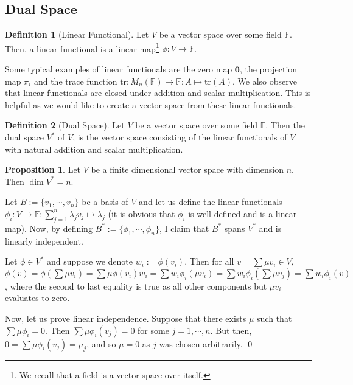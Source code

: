\documentclass[
]{article}
\theoremstyle{definition}
\newtheorem{prop}{Proposition}[section]
\theoremstyle{definition}
\newtheorem{definition}{Definition}[section]
\begin{document}
\hypertarget{dual-space}{%
\subsection{Dual Space}\label{dual-space}}

\begin{definition}[Linear Functional]
  Let \(V\) be a vector space over some field \(\mathbb{F}\). Then, a linear 
  functional is a linear map\footnote{We recall that a field is a vector 
  space over itself.} \(\phi : V \to \mathbb{F}\).
\end{definition}

Some typical examples of linear functionals are the zero map
\(\mathbf{0}\), the projection map \(\pi_i\) and the trace function
\(\text{tr} : M_n(\mathbb{F}) \to \mathbb{F} : A \mapsto \text{tr}(A)\).
We also observe that linear functionals are closed under addition and
scalar multiplication. This is helpful as we would like to create a
vector space from these linear functionals.

\begin{definition}[Dual Space]
  Let \(V\) be a vector space over some field \(\mathbb{F}\). Then the dual space 
  \(V^*\) of \(V\), is the vector space consisting of the linear functionals of 
  \(V\) with natural addition and scalar multiplication.
\end{definition}

\begin{prop}
  Let \(V\) be a finite dimensional vector space with dimension \(n\). Then 
  \(\dim V^* = n\).
\end{prop}
\proof

Let \(B := \{v_1, \cdots, v_n\}\) be a basis of \(V\) and let us define
the linear functionals
\(\phi_i : V \to \mathbb{F} :  \sum_{j = 1}^n \lambda_j v_j \mapsto \lambda_j\)
(it is obvious that \(\phi_i\) is well-defined and is a linear map).
Now, by defining \(B^* := \{\phi_1, \cdots, \phi_n\}\), I claim that
\(B^*\) spans \(V^*\) and is linearly independent.

Let \(\phi \in V^*\) and suppose we denote \(w_i := \phi(v_i)\). Then
for all \(v = \sum \mu v_i \in V\),
\(\phi(v) = \phi(\sum \mu v_i) = \sum \mu \phi(v_i)  w_i = \sum w_i \phi_i(\mu v_i) = \sum w_i \phi_i(\sum \mu v_j) = \sum w_i \phi_i(v)\),
where the second to last equality is true as all other components but
\(\mu v_i\) evaluates to zero.

Now, let us prove linear independence. Suppose that there exists \(\mu\)
such that \(\sum \mu \phi_i = 0\). Then \(\sum \mu \phi_i(v_j) = 0\) for
some \(j = 1, \cdots, n\). But then,
\(0 = \sum \mu \phi_i(v_j) = \mu_j\), and so \(\mu = 0\) as \(j\) was
chosen arbitrarily. \qed
\end{document}
